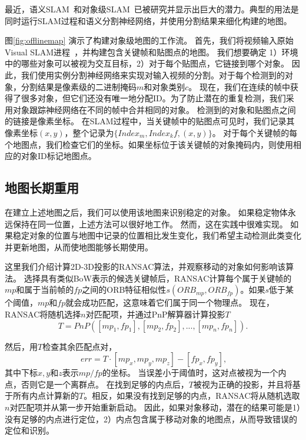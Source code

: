 最近，语义SLAM~\cite{bowman2017probabilistic,kaneko2018mask}和对象级SLAM~\cite{mccormac2018fusion++,strecke2019fusion}已被研究并显示出巨大的潜力。典型的用法是同时运行SLAM过程和语义分割神经网络，并使用分割结果来细化构建的地图。

图\ref{fig:offlinemap} 演示了构建对象级地图的工作流。
首先，我们将视频输入原始Visual SLAM进程~\cite{mur2017orb}，并构建包含关键帧和贴图点的地图。
我们想要确定 1）环境中的哪些对象可以被视为交互目标，2）对于每个贴图点，它链接到哪个对象。
因此，我们使用实例分割神经网络\cite{He_2017_ICCV}来实现对输入视频的分割。对于每个检测到的对象，分割结果是像素级的二进制掩码$m$和对象类别$c$。
现在，我们在连续的帧中获得了很多对象，但它们还没有唯一地分配ID。为了防止潜在的重复检测，我们采用对象跟踪神经网络在不同的帧中合并相同的对象。
检测到的对象和贴图点之间的链接是像素坐标。
在SLAM过程中，当关键帧中的贴图点可见时，我们记录其像素坐标$(x,y)$，整个记录为$\{Index_m, Index_kf, (x,y)\}$。
对于每个关键帧的每个地图点，我们检查它们的坐标。如果坐标位于该关键帧的对象掩码内，则使用相应的对象ID标记地图点。

\subsection{\textbf{地图长期重用}}
在建立上述地图之后，我们可以使用该地图来识别稳定的对象。
如果稳定物体永远保持在同一位置，上述方法可以很好地工作。
然而，这在实践中很难实现。
如果稳定对象的位置与地图中记录的位置相比发生变化，我们希望主动检测此类变化并更新地图，从而使地图能够长期使用。

这里我们介绍计算2D-3D投影的RANSAC\cite{derpanis2010overview}算法，并观察移动的对象如何影响该算法。
选择具有类似BoW表示的候选关键帧后，RANSAC计算每个属于关键帧的$mp$和属于当前帧的$fp$之间的ORB特征相似性$s(ORB_{mp}, ORB_{fp})$。如果$s$低于某个阈值，$mp$和$fp$就会成功匹配，这意味着它们属于同一个物理点。
现在，RANSAC将随机选择$n$对匹配项，并通过PnP解算器计算投影$T$
\begin{equation}\label{equ:pnp}
    T = PnP([mp_1, fp_1],[mp_2, fp_2], ..., [mp_n, fp_n]).
\end{equation} 

然后，用$T$检查其余匹配点对，
\begin{equation}\label{equ:check}
    \
    err = T \cdot [mp_x, mp_y, mp_z] - [fp_x, fp_y],
\end{equation} 
其中下标$x,y$和$z$表示$mp/fp$的坐标。
当误差小于阈值时，这对点被视为一个内点，否则它是一个离群点。
在找到足够的内点后，$T$被视为正确的投影，并且将基于所有内点计算新的$T$。相反，如果没有找到足够的内点，RANSAC将从随机选取$n$对匹配项并从第一步开始重新启动。
因此，如果对象移动，潜在的结果可能是1）没有足够的内点进行定位，2）内点包含属于移动对象的地图点，从而导致错误的定位和识别。

